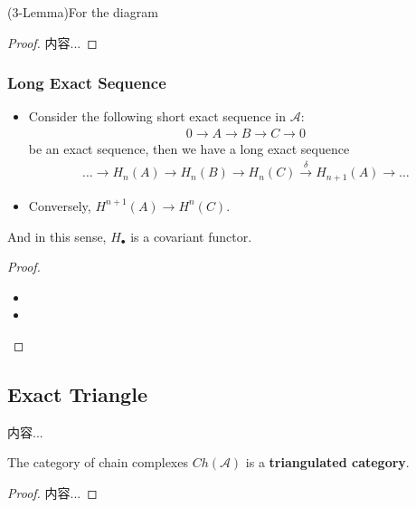 \documentclass[Total.tex]{subfiles}
\begin{document}
			\begin{corollary}
				(3-Lemma)For the diagram
				\begin{center}
				\end{center}
			\end{corollary}
			\begin{proof}
				内容...
			\end{proof}
			\subsubsection{Long Exact Sequence}
			\begin{theorem}
				\begin{itemize}
					\item Consider the following short exact sequence in $\mathcal{A}$:
					\begin{gather*}
						0\rightarrow A\rightarrow B\rightarrow C\rightarrow 0
					\end{gather*}
					be an exact sequence, then we have a long exact sequence 
					\begin{gather*}
						\dots\rightarrow H_n(A)\rightarrow H_n(B)\rightarrow H_n(C)\stackrel{\delta}{\rightarrow} H_{n+1}(A)\rightarrow\dots
					\end{gather*}
					\item Conversely, $H^{n+1}(A)\rightarrow H^n(C)$.
				\end{itemize}
				And in this sense, $H_\bullet$ is a covariant functor.
			\end{theorem}
			\begin{proof}
				\begin{itemize}
					\item 
					\item 
				\end{itemize}
			\end{proof}
			\subsection{Exact Triangle}
				\begin{Def}
					内容...
				\end{Def}
				
				\begin{corollary}
					The category of chain complexes $Ch(\mathcal{A})$ is a \textbf{triangulated category}.
				\end{corollary}
				\begin{proof}
					内容...
				\end{proof}
\end{document}
